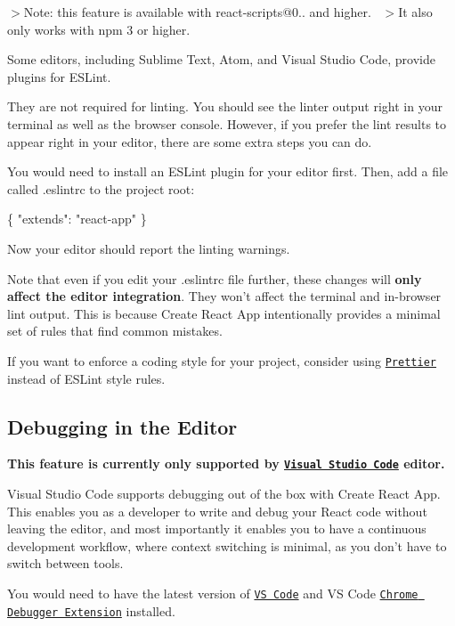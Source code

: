 $>$Note\+: this feature is available with {\ttfamily react-\/scripts@0..} and higher.~\newline
 $>$It also only works with npm 3 or higher.

Some editors, including Sublime Text, Atom, and Visual Studio Code, provide plugins for E\+S\+Lint.

They are not required for linting. You should see the linter output right in your terminal as well as the browser console. However, if you prefer the lint results to appear right in your editor, there are some extra steps you can do.

You would need to install an E\+S\+Lint plugin for your editor first. Then, add a file called {\ttfamily .eslintrc} to the project root\+:


\begin{DoxyCode}
\{
  "extends": "react-app"
\}
\end{DoxyCode}


Now your editor should report the linting warnings.

Note that even if you edit your {\ttfamily .eslintrc} file further, these changes will {\bfseries only affect the editor integration}. They won’t affect the terminal and in-\/browser lint output. This is because Create React App intentionally provides a minimal set of rules that find common mistakes.

If you want to enforce a coding style for your project, consider using \href{https://github.com/jlongster/prettier}{\tt Prettier} instead of E\+S\+Lint style rules.

\subsection*{Debugging in the Editor}

{\bfseries This feature is currently only supported by \href{https://code.visualstudio.com}{\tt Visual Studio Code} editor.}

Visual Studio Code supports debugging out of the box with Create React App. This enables you as a developer to write and debug your React code without leaving the editor, and most importantly it enables you to have a continuous development workflow, where context switching is minimal, as you don’t have to switch between tools.

You would need to have the latest version of \href{https://code.visualstudio.com}{\tt VS Code} and VS Code \href{https://marketplace.visualstudio.com/items?itemName=msjsdiag.debugger-for-chrome}{\tt Chrome Debugger Extension} installed.

